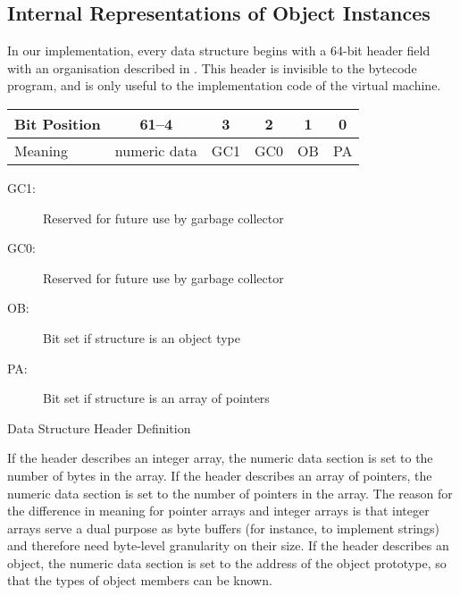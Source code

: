 		\subsection{Internal Representations of Object Instances}
		In our implementation, every data structure begins with a 64-bit header field with an organisation described in . This header is invisible to the bytecode program, and is only useful to the implementation code of the virtual machine.
		
		\begin{myfigure}
			\begin{tabular}{|l|c| c| c|c|c|}
				\hline
				Bit Position & 61--4 & 3 & 2 & 1 & 0 \\
				\hline
				Meaning & numeric data & GC1 & GC0 & OB & PA \\
				\hline
			\end{tabular}
			\newline
			\begin{description}
				\item[GC1:] Reserved for future use by garbage collector
				\item[GC0:] Reserved for future use by garbage collector
				\item[OB:] Bit set if structure is an object type
				\item[PA:] Bit set if structure is an array of pointers
			\end{description}
			
			\caption{Data Structure Header Definition}
			\label{fig:objheader}
		\end{myfigure}
		
		If the header describes an integer array, the numeric data section is set to the number of bytes in the array. If the header describes an array of pointers, the numeric data section is set to the number of pointers in the array. The reason for the difference in meaning for pointer arrays and integer arrays is that integer arrays serve a dual purpose as byte buffers (for instance, to implement strings) and therefore need byte-level granularity on their size. If the header describes an object, the numeric data section is set to the address of the object prototype, so that the types of object members can be known.

